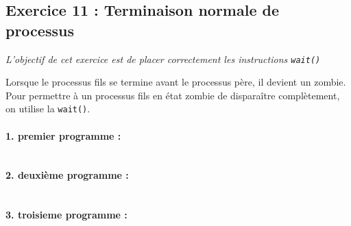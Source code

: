 \subsection{Exercice 11 : Terminaison normale de processus}
\textit{L’objectif de cet exercice est de placer correctement les instructions \texttt{wait()}}

Lorsque le processus fils se termine avant le processus père, il devient un zombie. Pour permettre à un processus fils en état zombie de disparaître complètement, on utilise la \texttt{wait()}.

\paragraph{1. premier programme :}
\inputminted[linenos,firstline=5, lastline=11]{cpp}{../sources/cpp/TP5-6/ex11-programme1.c}

\paragraph{2. deuxième programme :}
\inputminted[linenos,firstline=5, lastline=14]{cpp}{../sources/cpp/TP5-6/ex11-programme2.c}

\paragraph{3. troisieme programme :}
\inputminted[linenos,firstline=5, lastline=19]{cpp}{../sources/cpp/TP5-6/ex11-programme3.c}
